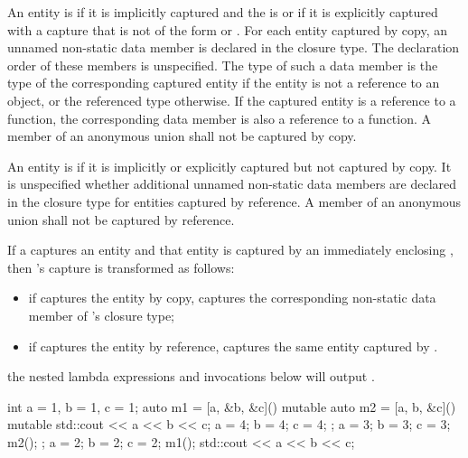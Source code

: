 \pnum
An entity is  if it is implicitly captured and the
 is \tcode{=} or if it is explicitly captured with a
capture that is not of the form \tcode{\&}  or
\tcode{\&}  .
For each entity captured by copy, an
unnamed non-static data member is declared in the closure type. The declaration order of
these members is unspecified. The type of such a data member is the type of the
corresponding captured entity if the entity is not a reference to an object, or the
referenced type otherwise. \enternote If the captured entity is a reference to a
function, the corresponding data member is also a reference to a function. \exitnote
A member of an anonymous union shall not be captured by copy.

\pnum
An entity is  if it is implicitly or explicitly
captured but not captured by copy. It is unspecified whether additional unnamed
non-static data members are declared in the closure type for entities captured by
reference. A member of an anonymous union shall not be captured by reference.

\pnum
If a   captures an entity and that entity is
captured by an immediately enclosing 
, then
's capture is transformed as follows:

\begin{itemize}
\item if  captures the entity by copy,
 captures the corresponding
non-static data member of 's closure type;

\item if  captures the entity by reference,
 captures the same
entity captured by .
\end{itemize}
\enterexample the nested lambda expressions and invocations below will output
.
\begin{codeblock}
int a = 1, b = 1, c = 1;
auto m1 = [a, &b, &c]() mutable {
  auto m2 = [a, b, &c]() mutable {
    std::cout << a << b << c;
    a = 4; b = 4; c = 4;
  };
  a = 3; b = 3; c = 3;
  m2();
};
a = 2; b = 2; c = 2;
m1();
std::cout << a << b << c;
\end{codeblock}
\exitexample


